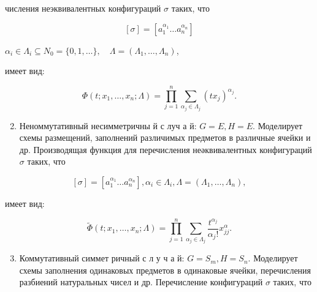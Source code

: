 \documentclass[10pt]{article}
\begin{document}
числения неэквивалентных конфигураций $\sigma$ таких, что



\[

[\sigma]=\left[a_{1}^{\alpha_{1}} \ldots a_{n}^{\alpha_{n}}\right]

\]



$\alpha_{i} \in \Lambda_{i} \subseteq N_{0}=\{0,1, \ldots\}, \quad \Lambda=\left(\Lambda_{1}, \ldots, \Lambda_{n}\right)$,



имеет вид:



\[

\Phi\left(t ; x_{1}, \ldots, x_{n} ; \Lambda\right)=\prod_{j=1}^{n} \sum_{\alpha_{j} \in \Lambda_{j}}\left(t x_{j}\right)^{\alpha_{j}} .

\]



\begin{enumerate}

  \setcounter{enumi}{1}

  \item Неноммутативный несимметричны й с луч а й: $G=E, H=E$. Моделирует схемы размещений, заполнений различимых предметов в различные ячейки и др. Производящая функция для перечисления неәквивалентных конфигураций $\sigma$ таких, что

\end{enumerate}



\[

[\sigma]=\left[a_{1}^{\alpha_{1}} \ldots a_{n}^{\alpha_{n}}\right], \alpha_{i} \in \Lambda_{i}, \Lambda=\left(\Lambda_{1}, \ldots, \Lambda_{n}\right),

\]



имеет вид:



\[

\tilde{\Phi}\left(t ; x_{1}, \ldots, x_{n} ; \Lambda\right)=\prod_{j=1}^{n} \sum_{\alpha_{j} \in \Lambda_{j}} \frac{t^{\alpha_{j}}}{\alpha_{j} !} x_{j j}^{\alpha} .

\]



\begin{enumerate}

  \setcounter{enumi}{2}

  \item Коммутативный симмет ричный с л у ч а й: $G=S_{m}, H=S_{n}$. Моделирует схемы заполнения одинаковых предметов в одинаковые ячейки, перечисления разбиений натуральных чисел и др. Перечисление конфигураций $\sigma$ таких, что

\end{enumerate}
\end{document}
